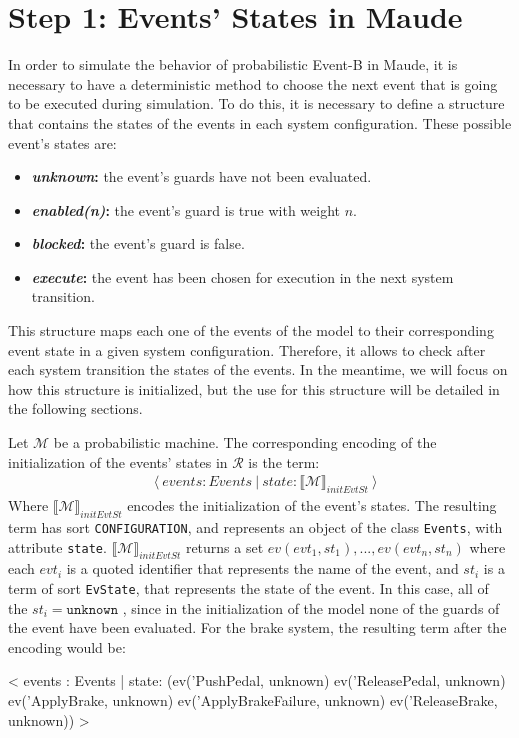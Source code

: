 \section{Step 1: Events' States in Maude}
In order to simulate the behavior of probabilistic Event-B in Maude, it is necessary to have a deterministic method to choose the next event that is going to be executed during simulation. To do this, it is necessary to define a structure that contains the states of the events in each system configuration. These possible event's states are:
\begin{itemize}
    \item \textbf{\textit{unknown}:} the event's guards have not been evaluated.
    \item \textbf{\textit{enabled(n)}:} the event's guard is true with weight $n$.
    \item \textbf{\textit{blocked}:} the event's guard is false.
    \item \textbf{\textit{execute}:} the event has been chosen for execution in the next system transition.
\end{itemize}
This structure maps each one of the events of the model to their corresponding event state in a given system configuration. Therefore, it allows to check after each system transition the states of the events. In the meantime, we will focus on how this structure is initialized, but the use for this structure will be detailed in the following sections.

Let $\mathscr{M}$ be a probabilistic machine. The corresponding encoding of the initialization of the events' states in $\mathscr{R}$ is the term:
    \begin{align*}
    & \langle \ events : Events \ | \ state :  \llbracket \mathscr{M} \rrbracket_{initEvtSt}  \ \rangle
    \end{align*}
Where $\llbracket \mathscr{M} \rrbracket_{initEvtSt}$ encodes the initialization of the event's states. The resulting term has sort \texttt{CONFIGURATION}, and represents an object of the class \texttt{Events}, with attribute \texttt{state}. $\llbracket \mathscr{M} \rrbracket_{initEvtSt}$ returns a set $ev(evt_1,st_1), ..., ev(evt_n,st_n)$ where each $evt_i$ is a quoted identifier that represents the name of the event, and $st_i$ is a term of sort \texttt{EvState}, that represents the state of the event. In this case, all of the $st_i = \texttt{unknown}$ , since in the initialization of the model none of the guards of the event have been evaluated. For the brake system, the resulting term after the encoding would be:
\begin{maude}

< events : Events | state: (ev('PushPedal, unknown) 
                            ev('ReleasePedal, unknown) 
                            ev('ApplyBrake, unknown) 
                            ev('ApplyBrakeFailure, unknown) 
                            ev('ReleaseBrake, unknown)) >
\end{maude}


